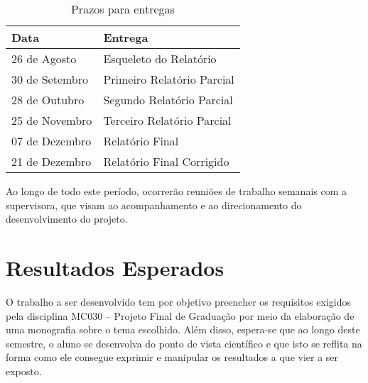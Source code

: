 \documentclass[a4paper,10pt]{article}
\begin{document}
\begin{table}[h!]
\centering
\caption{Prazos para entregas}
\label{tab:prazo}
\begin{tabular}{|l|l|}
\hline
Data           & Entrega                    \\\hline\hline
26 de Agosto   & Esqueleto do Relatório     \\
30 de Setembro & Primeiro Relatório Parcial \\
28 de Outubro  & Segundo Relatório Parcial  \\
25 de Novembro & Terceiro Relatório Parcial \\
07 de Dezembro & Relatório Final            \\
21 de Dezembro & Relatório Final Corrigido  \\\hline
\end{tabular}
\end{table}

Ao longo de todo este período, ocorrerão reuniões de trabalho semanais com a supervisora, que visam ao acompanhamento e ao direcionamento do desenvolvimento do projeto.


\section{Resultados Esperados}

O trabalho a ser desenvolvido tem por objetivo preencher os requisitos
exigidos pela disciplina MC030 -- Projeto Final de Graduação por meio
da elaboração de uma monografia sobre o tema escolhido. Além disso,
espera-se que ao longo deste semestre, o aluno se desenvolva do ponto
de vista científico e que isto se reflita na forma como ele consegue
exprimir e manipular os resultados a que vier a ser exposto.




\end{document}
